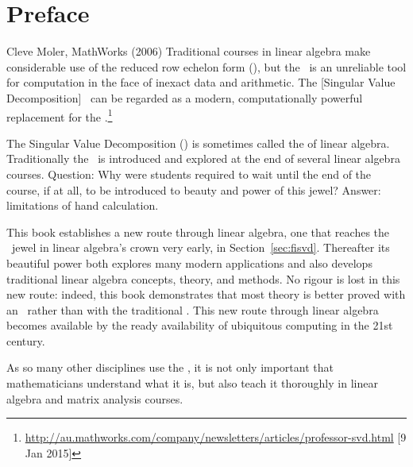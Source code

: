 
\maketitle


\tableofcontents


\chapter*{Preface}


\begin{quoted}{Cleve Moler, MathWorks (2006)}
Traditional courses in linear algebra make considerable use of the reduced row echelon form (\rref), but the \rref\ is an unreliable tool for computation in the face of inexact data and arithmetic. 
The [Singular Value Decomposition] \svd\ can be regarded as a modern, computationally powerful replacement for the \rref.\footnote{\url{http://au.mathworks.com/company/newsletters/articles/professor-svd.html} [9 Jan 2015]}
\end{quoted}

The Singular Value Decomposition (\svd) is sometimes called the \emph{} of linear algebra.
Traditionally the \svd\ is introduced and explored at the end of several linear algebra courses.
Question: Why were students required to wait until the end of the course, if at all, to be introduced to beauty and power of this jewel?
Answer: limitations of hand calculation.

This book establishes a new route through linear algebra, one that reaches the \svd\ jewel in linear algebra's crown very early, in Section~\ref{sec:fisvd}.
Thereafter its beautiful power both explores many modern applications and also develops traditional linear algebra concepts, theory, and methods.
No rigour is lost in this new route: indeed, this book demonstrates that most theory is better proved with an \svd\ rather than with the traditional \rref.
This new route through linear algebra becomes available by the ready availability of ubiquitous computing in the 21st century.


\begin{quoted}{\cite[p.30]{Turner2014}}
As so many other disciplines use the \svd, it is not only important that mathematicians understand what it is, but also teach it thoroughly in linear algebra and matrix analysis courses.
\end{quoted}



